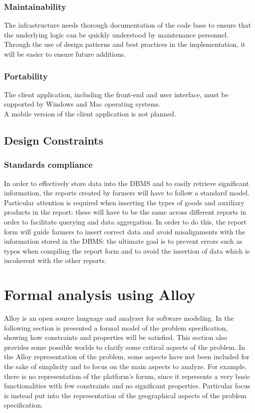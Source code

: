 \documentclass[10pt]{article}
\begin{document}
\subsubsection{Maintainability}
The infrastructure needs thorough documentation of the code base to ensure that the underlying logic can be quickly understood by maintenance personnel.\\
Through the use of design patterns and best practices in the implementation, it will be easier to ensure future additions.
\subsubsection{Portability}
The client application, including the front-end and user interface, must be supported by Windows and Mac operating systems. \\
A mobile version of the client application is not planned.
\subsection{Design Constraints}
\subsubsection{Standards compliance}
In order to effectively store data into the DBMS and to easily retrieve significant information, the reports created by farmers will have to follow a standard model.
Particular attention is required when inserting the types of goods and auxiliary products in the report: these will have to be the same across different reports in order
to facilitate querying and data aggregation. In order to do this, the report form will guide farmers to insert correct data and avoid misalignments with the information stored 
in the DBMS: the ultimate goal is to prevent errors such as typos when compiling the report form and to avoid the insertion of data which is incoherent with the other reports. 

\section{Formal analysis using Alloy}
Alloy \cite{Alloy} is an open source language and analyzer for software modeling.
In the following section is presented a formal model of the problem specification, showing how constraints and properties will be satisfied. This section also provides some possible worlds
to clarify some critical aspects of the problem. In the Alloy representation of the problem, some aspects have not been included for the sake of simplicity and to focus on the main aspects to analyze.
For example, there is no representation of the platform's forum, since it represents a very basic functionalities with few constraints and no significant properties. Particular focus is instead put into
the representation of the geographical aspects of the problem specification.
\end{document}
